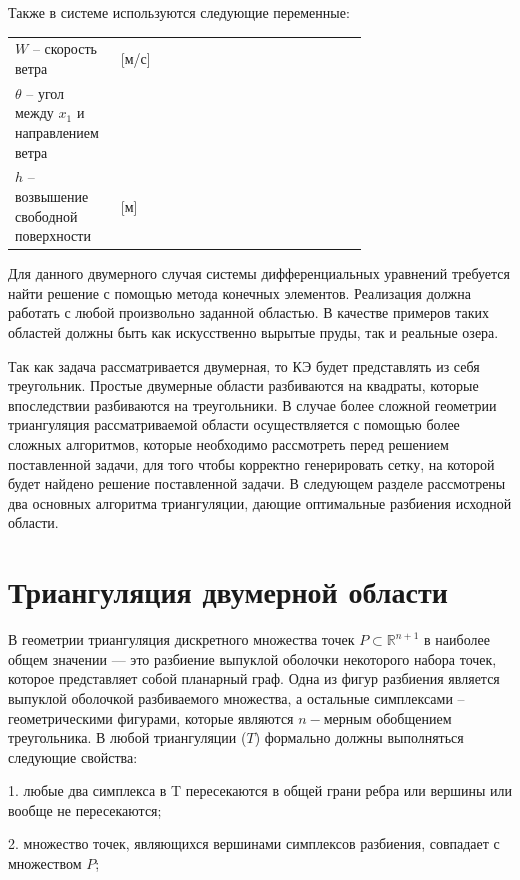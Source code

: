 \documentclass[14pt]{extreport}
\begin{document}
Также в системе используются следующие переменные:

\begin{threeparttable}
\begin{longtable}[H]{lp{0.7\linewidth}}
{$W$} -- скорость ветра & [м/с] \\
{$\theta$} -- угол между $x_1$ и направлением ветра & \\
{$h$} -- возвышение свободной поверхности & [м]
\end{longtable} 
\end{threeparttable}


Для данного двумерного случая системы дифференциальных уравнений требуется найти решение с помощью метода конечных элементов. Реализация должна работать с любой произвольно заданной областью. В качестве примеров таких областей должны быть как искусственно вырытые пруды, так и реальные озера. 

Так как задача рассматривается двумерная, то КЭ будет представлять из себя треугольник. Простые двумерные области разбиваются на квадраты, которые впоследствии разбиваются на треугольники. В случае более сложной геометрии триангуляция рассматриваемой области осуществляется с помощью более сложных алгоритмов, которые необходимо рассмотреть перед решением поставленной задачи, для того чтобы корректно генерировать сетку, на которой будет найдено решение поставленной задачи. В следующем разделе рассмотрены два основных алгоритма триангуляции, дающие оптимальные разбиения исходной области.

\chapter{Триангуляция двумерной области}

В геометрии триангуляция дискретного множества точек $P\subset {\mathbb  {R}}^{{n+1}}$ в наиболее общем значении — это разбиение  выпуклой оболочки некоторого набора точек, которое представляет собой планарный граф\cite{bib:triangle:delone}. Одна из фигур разбиения является выпуклой оболочкой разбиваемого множества, а остальные симплексами --  геометрическими фигурами, которые являются $n-$мерным обобщением треугольника. В любой триангуляции ($T$) формально должны выполняться следующие свойства:

	1. любые два симплекса в T пересекаются в общей грани ребра или вершины или вообще не пересекаются;

	2. множество точек, являющихся вершинами симплексов разбиения, совпадает с множеством $P$;
	
\end{document}
